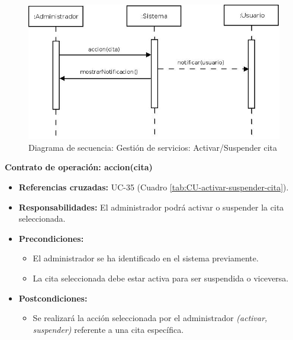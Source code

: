 \begin{figure}[H]
\centering
  \includegraphics[scale=.55]{img/secuencias/gestion-servicios-suspender-activar-cita.jpeg}
  \caption{Diagrama de secuencia: Gestión de servicios: Activar/Suspender cita}
  \label{fig:secuencia-gestion-servicios-suspender-activar-cita}
\end{figure}

\textbf{Contrato de operación: accion(cita)}
\begin{itemize}
\item \textbf{Referencias cruzadas:} UC-35 (Cuadro \ref{tab:CU-activar-suspender-cita}).
\item \textbf{Responsabilidades:} El administrador podrá activar o suspender la cita seleccionada.
\item \textbf{Precondiciones:} 
 \begin{itemize}
\item El administrador se ha identificado en el sistema previamente.
\item La cita seleccionada debe estar activa para ser suspendida o viceversa.
\end {itemize}
\item \textbf{Postcondiciones:} 
 \begin{itemize}
\item Se realizará la acción seleccionada por el administrador \textit{(activar, suspender)} referente a una cita específica.
\end {itemize}
\end {itemize}

